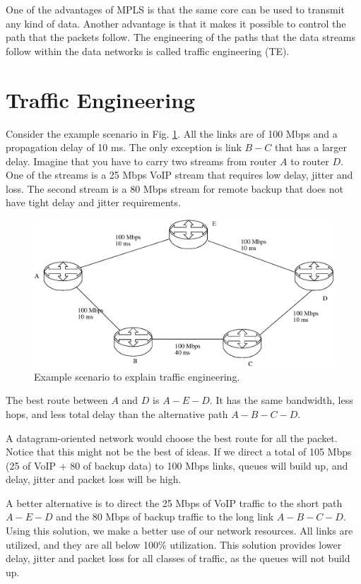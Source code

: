 One of the advantages of MPLS is that the same core can be used to transmit any kind of data.
Another advantage is that it makes it possible to control the path that the packets follow.
The engineering of the paths that the data streams follow within the data networks is called traffic engineering (TE).

\section{Traffic Engineering}

Consider the example scenario in Fig. \ref{fig:traffic-engineering}.
All the links are of 100 Mbps and a propagation delay of 10 ms.
The only exception is link $B-C$ that has a larger delay.
Imagine that you have to carry two streams from router $A$ to router $D$.
One of the streams is a 25 Mbps VoIP stream that requires low delay, jitter and loss.
The second stream is a 80 Mbps stream for remote backup that does not have tight delay and jitter requirements.

\begin{figure}[!h]
\centering
\includegraphics[width=\linewidth]{figures/traffic-engineering.eps}
\caption{Example scenario to explain traffic engineering.}
\label{fig:traffic-engineering}
\end{figure}

The best route between $A$ and $D$ is $A-E-D$.
It has the same bandwidth, less hops, and less total delay than the alternative path $A-B-C-D$.

A datagram-oriented network would choose the best route for all the packet.
Notice that this might not be the best of ideas.
If we direct a total of 105 Mbps (25 of VoIP + 80 of backup data) to 100 Mbps links, queues will build up, and delay, jitter and packet loss will be high.

A better alternative is to direct the 25 Mbps of VoIP traffic to the short path $A-E-D$ and the 80 Mbps of backup traffic to the long link $A-B-C-D$.
Using this solution, we make a better use of our network resources.
All links are utilized, and they are all below 100\% utilization.
This solution provides lower delay, jitter and packet loss for all classes of traffic, as the queues will not build up.

